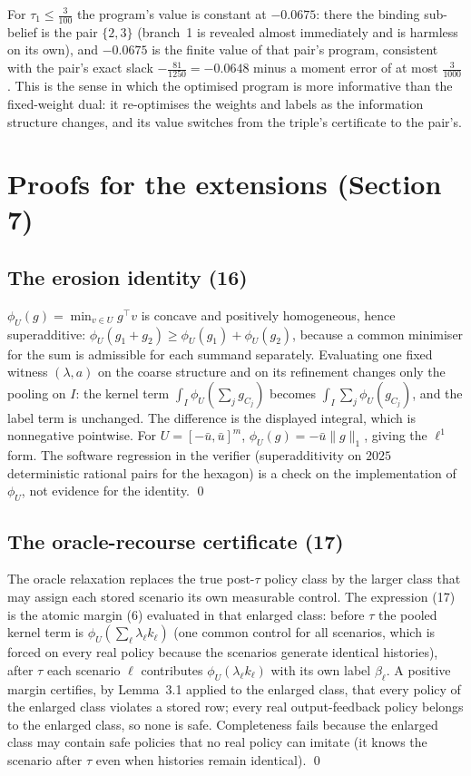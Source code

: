 \documentclass[11pt,a4paper]{article}
\theoremstyle{plain}
\theoremstyle{definition}
\theoremstyle{remark}
\newcommand{\tfr}[2]{\tfrac{#1}{#2}}
\begin{document}
For $\tau_1\le\tfr3{100}$ the program's value is constant at $-0.0675$: there the binding sub-belief is the pair $\{2,3\}$ (branch~1 is revealed almost immediately and is harmless on its own), and $-0.0675$ is the finite value of that pair's program, consistent with the pair's exact slack $-\tfr{81}{1250}=-0.0648$ minus a moment error of at most $\tfr3{1000}$. This is the sense in which the optimised program is more informative than the fixed-weight dual: it re-optimises the weights and labels as the information structure changes, and its value switches from the triple's certificate to the pair's.
\section{Proofs for the extensions (Section 7)}\label{S:extensions}

\subsection{The erosion identity (16)}
$\phi_U(g)=\min_{v\in U}g^\top v$ is concave and positively homogeneous, hence superadditive: $\phi_U(g_1+g_2)\ge\phi_U(g_1)+\phi_U(g_2)$, because a common minimiser for the sum is admissible for each summand separately. Evaluating one fixed witness $(\lambda,a)$ on the coarse structure and on its refinement changes only the pooling on $I$: the kernel term $\int_I\phi_U(\sum_jg_{C_j})$ becomes $\int_I\sum_j\phi_U(g_{C_j})$, and the label term is unchanged. The difference is the displayed integral, which is nonnegative pointwise. For $U=[-\bar u,\bar u]^m$, $\phi_U(g)=-\bar u\|g\|_1$, giving the $\ell^1$ form. The software regression in the verifier (superadditivity on $2025$ deterministic rational pairs for the hexagon) is a check on the implementation of $\phi_U$, not evidence for the identity. \qed

\subsection{The oracle-recourse certificate (17)}
The oracle relaxation replaces the true post-$\tau$ policy class by the larger class that may assign each stored scenario its own measurable control. The expression (17) is the atomic margin (6) evaluated in that enlarged class: before $\tau$ the pooled kernel term is $\phi_U(\sum_\ell\lambda_\ell k_\ell)$ (one common control for all scenarios, which is forced on every real policy because the scenarios generate identical histories), after $\tau$ each scenario $\ell$ contributes $\phi_U(\lambda_\ell k_\ell)$ with its own label $\beta_\ell$. A positive margin certifies, by Lemma~3.1 applied to the enlarged class, that every policy of the enlarged class violates a stored row; every real output-feedback policy belongs to the enlarged class, so none is safe. Completeness fails because the enlarged class may contain safe policies that no real policy can imitate (it knows the scenario after $\tau$ even when histories remain identical). \qed
\end{document}
